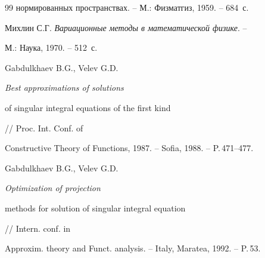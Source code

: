 \begin{thebibliography}{99}
{нормированных пространствах}. -- М.: Физматгиз, 1959. -- 684~с.




Михлин С.Г. {\em Вариационные методы в математической физике}. --


М.: Наука, 1970. -- 512~с.




Gabdulkhaev B.G., Velev G.D. {\em Best approximations of solutions


of singular integral equations of the first kind} // Proc. Int. Conf. of


Constructive Theory of Functions, 1987. -- Sofia, 1988. -- P.\,471--477.




Gabdulkhaev B.G., Velev G.D. {\em Optimization of projection


methods for solution of singular integral equation} // Intern. conf. in


Approxim. theory and Funct. analysis. -- Italy, Maratea, 1992. -- P.\,53.





\end{thebibliography}





\vskip 2cm












\label{end}








